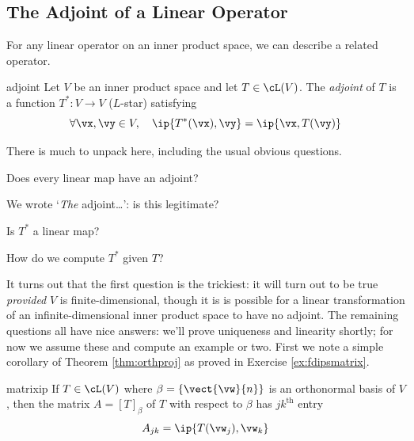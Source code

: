 \clearpage

\subsection{The Adjoint of a Linear Operator}

For any linear operator on an inner product space, we can describe a related operator.

\begin{defn}{}{adjoint}
Let $V$ be an inner product space and let $T\in\cL(V)$. The \emph{adjoint} of $T$ is a function $T^*:V\to V$ ($L$-star) satisfying
\[\forall \vx,\vy\in V,\quad \ip{T^*(\vx),\vy}=\ip{\vx,T(\vy)}\] 
\end{defn}

There is much to unpack here, including the usual obvious questions.
\begin{description}\itemsep0pt
  \item[\normalfont\emph{Existence}] Does every linear map have an adjoint?
  \item[\normalfont\emph{Uniqueness}] We wrote `\emph{The} adjoint\ldots': is this legitimate?
  \item[\normalfont\emph{Linearity}]  Is $T^*$ a linear map?
  \item[\normalfont\emph{Computation}] How do we compute $T^*$ given $T$?
\end{description}

It turns out that the first question is the trickiest: it will turn out to be true \emph{provided} $V$ is finite-dimensional, though it is is possible for a linear transformation of an infinite-dimensional inner product space to have no adjoint. The remaining questions all have nice answers: we'll prove uniqueness and linearity shortly; for now we assume these and compute an example or two. First we note a simple corollary of Theorem \ref{thm:orthproj} as proved in Exercise \ref{ex:fdipsmatrix}.

\begin{cor}{}{matrixip}
If $T\in\cL(V)$ where $\beta=\{\vect{\vw}{n}\}$ is an orthonormal basis of $V$, then the matrix $A=[T]_\beta$ of $T$ with respect to $\beta$ has $jk^\text{th}$ entry
\[A_{jk}=\ip{T(\vw_j),\vw_k}\]
\end{cor}

